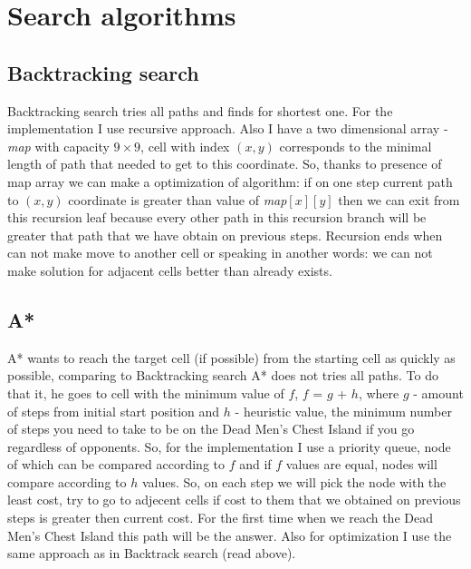\documentclass[a4paper]{article}
\begin{document}
\section{Search algorithms}
\subsection{Backtracking search}
Backtracking search tries all paths and finds for shortest one. For the implementation I use recursive approach. Also I have a two dimensional array - \emph{map} with capacity $9 \times 9$, cell with index $(x,y)$ corresponds to the minimal length of path that needed to get to this coordinate. So, thanks to presence of map array we can make a optimization of algorithm: if on one step current path to $(x, y)$ coordinate is greater than value of \emph{map}$[x][y]$ then we can exit from this recursion leaf because every other path in this recursion branch will be greater that path that we have obtain on previous steps. Recursion ends when can not make move to another cell or speaking in another words: we can not make solution for adjacent cells better than already exists.
\subsection{A*}
A* wants to reach the target cell (if possible) from the starting cell as quickly as possible, comparing to Backtracking search A* does not tries all paths. To do that it, he goes to cell with the minimum value of \emph{$f$}, \emph{$f$} = \emph{$g$} + \emph{$h$}, where \emph{$g$} - amount of steps from initial start position and \emph{$h$} - heuristic value, the minimum number of steps you need to take to be on the Dead Men's Chest Island if you go regardless of opponents. So, for the implementation I use a priority queue, node of which can be compared according to \emph{$f$} and if \emph{$f$} values are equal, nodes will compare according to \emph{$h$} values. So, on each step we will pick the node with the least cost, try to go to adjecent cells if cost to them that we obtained on previous steps is greater then current cost. For the first time when we reach the Dead Men's Chest Island this path will be the answer. Also for optimization I use the same approach as in Backtrack search (read above).

\end{document}
